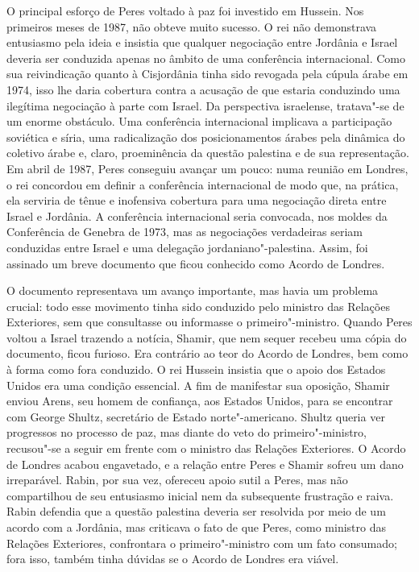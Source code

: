 O principal esforço de Peres voltado à paz foi investido em Hussein. Nos
primeiros meses de 1987, não obteve muito sucesso. O rei não demonstrava
entusiasmo pela ideia e insistia que qualquer negociação entre Jordânia
e Israel deveria ser conduzida apenas no âmbito de uma conferência
internacional. Como sua reivindicação quanto à Cisjordânia tinha sido
revogada pela cúpula árabe em 1974, isso lhe daria cobertura contra a
acusação de que estaria conduzindo uma ilegítima negociação à parte com
Israel. Da perspectiva israelense, tratava"-se de um enorme obstáculo.
Uma conferência internacional implicava a participação soviética e
síria, uma radicalização dos posicionamentos árabes pela dinâmica do
coletivo árabe e, claro, proeminência da questão palestina e de sua
representação. Em abril de 1987, Peres conseguiu avançar um pouco: numa
reunião em Londres, o rei concordou em definir a conferência
internacional de modo que, na prática, ela serviria de tênue e inofensiva
cobertura para uma negociação direta entre Israel e Jordânia. A
conferência internacional seria convocada, nos moldes da Conferência de
Genebra de 1973, mas as negociações verdadeiras seriam conduzidas entre
Israel e uma delegação jordaniano"-palestina. Assim, foi assinado um
breve documento que ficou conhecido como Acordo de Londres.

O documento representava um avanço importante, mas havia um problema
crucial: todo esse movimento tinha sido conduzido pelo ministro das
Relações Exteriores, sem que consultasse ou informasse o primeiro"-ministro.
Quando Peres voltou a Israel trazendo a notícia, Shamir, que nem sequer
recebeu uma cópia do documento, ficou furioso. Era contrário ao teor do
Acordo de Londres, bem como à forma como fora conduzido. O rei Hussein
insistia que o apoio dos Estados Unidos era uma condição essencial. A
fim de manifestar sua oposição, Shamir enviou Arens, seu homem de
confiança, aos Estados Unidos, para se encontrar com George Shultz,
secretário de Estado norte"-americano. Shultz queria ver progressos no
processo de paz, mas diante do veto do primeiro"-ministro, recusou"-se a
seguir em frente com o ministro das Relações Exteriores. O Acordo de
Londres acabou engavetado, e a relação entre Peres e Shamir sofreu um
dano irreparável. Rabin, por sua vez, ofereceu apoio sutil a Peres, mas
não compartilhou de seu entusiasmo inicial nem da subsequente frustração
e raiva. Rabin defendia que a questão palestina deveria ser resolvida
por meio de um acordo com a Jordânia, mas criticava o fato de que Peres,
como ministro das Relações Exteriores, confrontara o primeiro"-ministro
com um fato consumado; fora isso, também tinha dúvidas se o Acordo de
Londres era viável.

